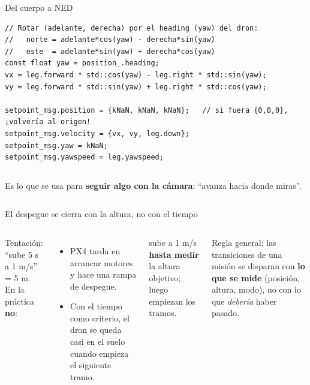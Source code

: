\begin{frame}[fragile]{Del cuerpo a NED}
  \begin{lstlisting}[style=cpp,caption={velocity\_control.cpp}]
// Rotar (adelante, derecha) por el heading (yaw) del dron:
//   norte = adelante*cos(yaw) - derecha*sin(yaw)
//   este  = adelante*sin(yaw) + derecha*cos(yaw)
const float yaw = position_.heading;
vx = leg.forward * std::cos(yaw) - leg.right * std::sin(yaw);
vy = leg.forward * std::sin(yaw) + leg.right * std::cos(yaw);

setpoint_msg.position = {kNaN, kNaN, kNaN};   // si fuera {0,0,0}, ¡volvería al origen!
setpoint_msg.velocity = {vx, vy, leg.down};
setpoint_msg.yaw = kNaN;
setpoint_msg.yawspeed = leg.yawspeed;
  \end{lstlisting}
  \begin{columns}[c]
    \centering
    \small
    Es lo que se usa para \textbf{seguir algo con la cámara}: ``avanza hacia donde miras''.
  \end{columns}
\end{frame}

\begin{frame}{El despegue se cierra con la altura, no con el tiempo}
  \begin{columns}[c]
    \small
    Tentación: ``sube 5 s a 1 m/s'' = 5 m. En la práctica \textbf{no}:
    \begin{itemize}
      \item PX4 tarda en arrancar motores y hace una rampa de despegue.
      \item Con el tiempo como criterio, el dron se queda casi en el suelo cuando empieza el siguiente tramo.
    \end{itemize}
     sube a 1 m/s \textbf{hasta medir} la altura objetivo; luego empiezan los tramos.
    \begin{idea}
      \small Regla general: las transiciones de una misión se disparan con \textbf{lo que se mide} (posición,
      altura, modo), no con lo que \emph{debería} haber pasado.
    \end{idea}
  \end{columns}
\end{frame}

